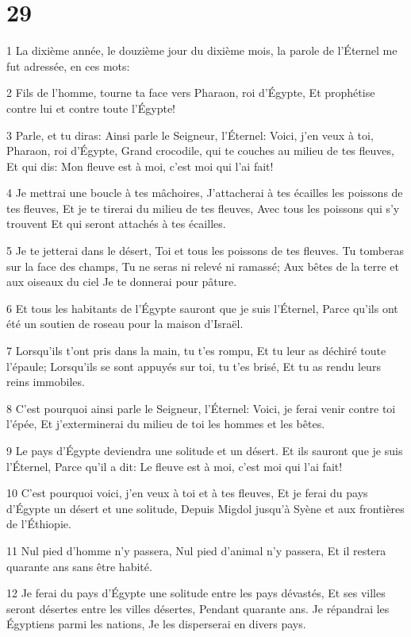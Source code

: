 \chapter{29}

\par 1 La dixième année, le douzième jour du dixième mois, la parole de l'Éternel me fut adressée, en ces mots:
\par 2 Fils de l'homme, tourne ta face vers Pharaon, roi d'Égypte, Et prophétise contre lui et contre toute l'Égypte!
\par 3 Parle, et tu diras: Ainsi parle le Seigneur, l'Éternel: Voici, j'en veux à toi, Pharaon, roi d'Égypte, Grand crocodile, qui te couches au milieu de tes fleuves, Et qui dis: Mon fleuve est à moi, c'est moi qui l'ai fait!
\par 4 Je mettrai une boucle à tes mâchoires, J'attacherai à tes écailles les poissons de tes fleuves, Et je te tirerai du milieu de tes fleuves, Avec tous les poissons qui s'y trouvent Et qui seront attachés à tes écailles.
\par 5 Je te jetterai dans le désert, Toi et tous les poissons de tes fleuves. Tu tomberas sur la face des champs, Tu ne seras ni relevé ni ramassé; Aux bêtes de la terre et aux oiseaux du ciel Je te donnerai pour pâture.
\par 6 Et tous les habitants de l'Égypte sauront que je suis l'Éternel, Parce qu'ils ont été un soutien de roseau pour la maison d'Israël.
\par 7 Lorsqu'ils t'ont pris dans la main, tu t'es rompu, Et tu leur as déchiré toute l'épaule; Lorsqu'ils se sont appuyés sur toi, tu t'es brisé, Et tu as rendu leurs reins immobiles.
\par 8 C'est pourquoi ainsi parle le Seigneur, l'Éternel: Voici, je ferai venir contre toi l'épée, Et j'exterminerai du milieu de toi les hommes et les bêtes.
\par 9 Le pays d'Égypte deviendra une solitude et un désert. Et ils sauront que je suis l'Éternel, Parce qu'il a dit: Le fleuve est à moi, c'est moi qui l'ai fait!
\par 10 C'est pourquoi voici, j'en veux à toi et à tes fleuves, Et je ferai du pays d'Égypte un désert et une solitude, Depuis Migdol jusqu'à Syène et aux frontières de l'Éthiopie.
\par 11 Nul pied d'homme n'y passera, Nul pied d'animal n'y passera, Et il restera quarante ans sans être habité.
\par 12 Je ferai du pays d'Égypte une solitude entre les pays dévastés, Et ses villes seront désertes entre les villes désertes, Pendant quarante ans. Je répandrai les Égyptiens parmi les nations, Je les disperserai en divers pays.
